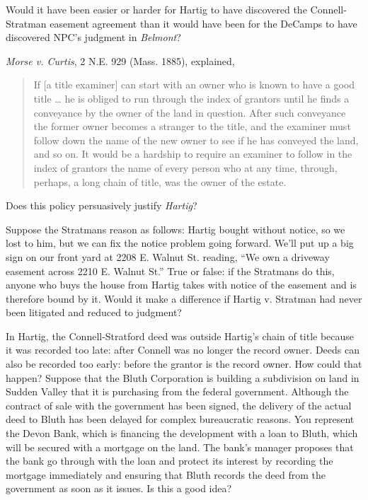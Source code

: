
\item Would it have been easier or harder for Hartig to have discovered the
Connell-Stratman easement agreement than it would have been for the DeCamps to
have discovered NPC's judgment in \textit{Belmont}? 

\item \textit{Morse v. Curtis}, 2 N.E. 929 (Mass. 1885), explained,
\begin{quote}
If [a title examiner] can start with an owner who is known to have a good title
\dots{} he is obliged to run through the index of grantors until he finds a
conveyance by the owner of the land in question. After such conveyance the
former owner becomes a stranger to the title, and the examiner must follow down
the name of the new owner to see if he has conveyed the land, and so on. It
would be a hardship to require an examiner to follow in the index of grantors
the name of every person who at any time, through, perhaps, a long chain of
title, was the owner of the estate.
\end{quote}
Does this policy persuasively justify \textit{Hartig}?



\item Suppose the Stratmans reason as follows: Hartig bought without notice, so
we lost to him, but we can fix the notice problem going forward. We'll put up a
big sign on our front yard at 2208 E. Walnut St. reading, ``We own a driveway
easement across 2210 E. Walnut St.'' True or false: if the Stratmans do this,
anyone who buys the house from Hartig takes with notice of the easement and is
therefore bound by it. Would it make a difference if Hartig v. Stratman had
never been litigated and reduced to judgment?


\item In Hartig, the Connell-Stratford deed was outside Hartig's chain of title
because it was recorded too late: after Connell was no longer the record owner.
Deeds can also be recorded too early: before the grantor is the record owner.
How could that happen? Suppose that the Bluth Corporation is building a
subdivision on land in Sudden Valley that it is purchasing from the federal
government. Although the contract of sale with the government has been signed,
the delivery of the actual deed to Bluth has been delayed for complex
bureaucratic reasons. You represent the Devon Bank, which is financing the
development with a loan to Bluth, which will be secured with a mortgage on the
land. The bank's manager proposes that the bank go through with the loan and
protect its interest by recording the mortgage immediately and ensuring that
Bluth records the deed from the government as soon as it issues. Is this a good
idea?


